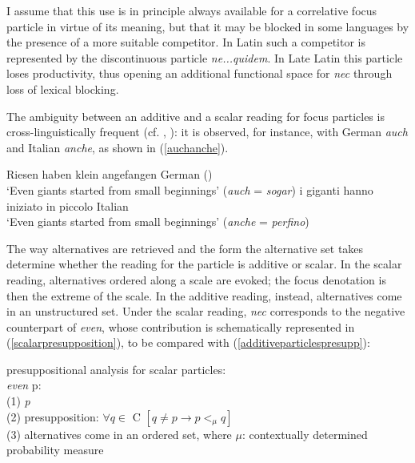 \documentclass[output=paper,modfonts,nonflat,citecolor=brown,
showindex
]{langsci/langscibook}
\begin{document}
I assume that this use is in principle always available for a correlative focus particle in virtue of its meaning, but that it may be blocked in some languages by the presence of a more suitable competitor. In Latin such a competitor is represented by the discontinuous particle {\em{ne...quidem}}. In Late Latin this particle loses productivity, thus opening an additional functional space for {\em{nec}} through loss of lexical blocking.

The ambiguity between an additive and a scalar reading for focus particles is cross-linguistically frequent (cf. \citealt[158-159]{Koenig91}, \citealt[24-25]{GastAuwera11}): it is observed, for instance, with German {\em{auch}} and Italian {\em{anche}}, as shown in (\ref{auchanche}).  

{\begin{exe}
\ex \label{auchanche}
\begin{xlist}
 Riesen haben klein angefangen \hfill German (\citealt[62]{Koenig91})\\
`Even giants started from small beginnings' ({\em{auch}} = {\em{sogar}})
 i giganti hanno iniziato in piccolo \hfill Italian\\
`Even giants started from small beginnings' ({\em{anche}} = {\em{perfino}})
\end{xlist}
\end{exe}}

\noindent The way alternatives are retrieved and the form the alternative set takes determine whether the reading for the particle is additive or scalar. In the scalar reading, alternatives ordered along a scale are evoked; the focus denotation is then the extreme of the scale. In the additive reading, instead, alternatives come in an unstructured set. Under the scalar reading, {\em{nec}} corresponds to the negative counterpart of {\em{even}}, whose contribution is schematically represented in (\ref{scalarpresupposition}), to be compared with (\ref{additiveparticlespresupp}): %

{\begin{exe}
\ex \label{scalarpresupposition} presuppositional analysis for scalar particles:\\
{\em{even}} p:\\
(1) {\em{p}}\\
(2) presupposition: $\forall q \in$ C $[q \neq p \rightarrow p <_{\mu} q]$\\
(3) alternatives come in an ordered set, where ${\mu}$: contextually determined probability measure %
\end{exe}} 
\end{document}
